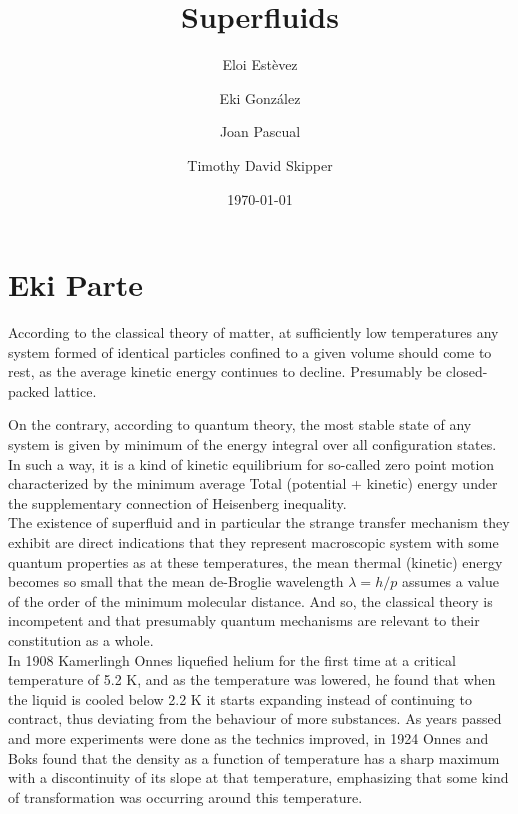 \documentclass{article}
\title{Superfluids}
\author{Eloi Estèvez \and Eki González \and Joan Pascual \and Timothy David Skipper}
\date{\today}
\begin{document}
\maketitle
\begin{abstract}
\end{abstract}

\tableofcontents
\newpage

\section{Eki Parte}

According to the classical theory of matter, at sufficiently low temperatures any system formed of identical particles confined to a given volume should come to rest, as the average kinetic energy continues to decline. Presumably be closed-packed lattice.


On the contrary, according to quantum theory, the most stable state of any system is given by minimum of the energy integral over all configuration states. In such a way, it is a kind of kinetic equilibrium for so-called zero point motion characterized by the minimum average Total (potential + kinetic) energy under the supplementary connection of Heisenberg inequality.
\\

The existence of superfluid and in particular the strange transfer mechanism they exhibit are direct indications that they represent macroscopic system with some quantum properties as at these temperatures, the mean thermal (kinetic) energy becomes so small that the mean de-Broglie wavelength $\lambda = h/p$ assumes a value of the order of the minimum molecular distance. And so, the classical theory is incompetent and that presumably quantum mechanisms are relevant to their constitution as a whole.
\\

In 1908 Kamerlingh Onnes liquefied helium for the first time at a critical temperature of 5.2 K, and as the temperature was lowered, he found that when the liquid is cooled below 2.2 K it starts expanding instead of continuing to contract, thus deviating from the behaviour of more substances.
As years passed and more experiments were done as the technics improved, in 1924 Onnes and Boks found that the density as a function of temperature has a sharp maximum with a discontinuity of its slope at that temperature, emphasizing that some kind of transformation was occurring around this temperature.
\\
\end{document}
